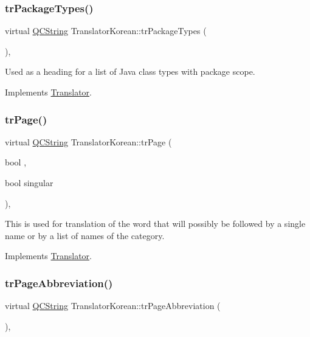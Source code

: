 \subsubsection{\texorpdfstring{trPackageTypes()}{trPackageTypes()}}
{\footnotesize\ttfamily virtual \mbox{\hyperlink{class_q_c_string}{Q\+C\+String}} Translator\+Korean\+::tr\+Package\+Types (\begin{DoxyParamCaption}{ }\end{DoxyParamCaption})\hspace{0.3cm}{\ttfamily [inline]}, {\ttfamily [virtual]}}

Used as a heading for a list of Java class types with package scope. 

Implements \mbox{\hyperlink{class_translator}{Translator}}.

\mbox{\label{class_translator_korean_a25d4e603ab21d42defd20e0caf6932cf}} 
\subsubsection{\texorpdfstring{trPage()}{trPage()}}
{\footnotesize\ttfamily virtual \mbox{\hyperlink{class_q_c_string}{Q\+C\+String}} Translator\+Korean\+::tr\+Page (\begin{DoxyParamCaption}\item[{bool}]{,  }\item[{bool}]{singular }\end{DoxyParamCaption})\hspace{0.3cm}{\ttfamily [inline]}, {\ttfamily [virtual]}}

This is used for translation of the word that will possibly be followed by a single name or by a list of names of the category. 

Implements \mbox{\hyperlink{class_translator}{Translator}}.

\mbox{\label{class_translator_korean_ac84e27e791237f3d36a71eb372963e76}} 
\subsubsection{\texorpdfstring{trPageAbbreviation()}{trPageAbbreviation()}}
{\footnotesize\ttfamily virtual \mbox{\hyperlink{class_q_c_string}{Q\+C\+String}} Translator\+Korean\+::tr\+Page\+Abbreviation (\begin{DoxyParamCaption}{ }\end{DoxyParamCaption})\hspace{0.3cm}{\ttfamily [inline]}, {\ttfamily [virtual]}}

